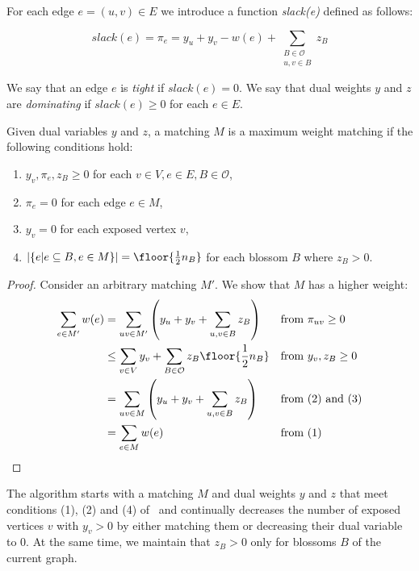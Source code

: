 \begin{defn}[slack]
    For each edge $e = (u, v) \in E$ we introduce a function \emph{slack(e)} defined as follows:

    \[slack(e) = \pi_e = y_u + y_v - w(e) + \sum_{\substack{B \in \mathcal{O} \\ u, v \in B}} z_B\]
\end{defn}

We say that an edge $e$ is \emph{tight} if $slack(e) = 0$. We say that dual weights $y$ and $z$ are \emph{dominating} if $slack(e) \geq 0$ for each $e \in E$.

\begin{theorem}\label{thm:conditions}
Given dual variables $y$ and $z$, a matching $M$ is a maximum weight matching if the following conditions hold:

\begin{enumerate}
    \renewcommand{\labelenumi}{(\arabic{enumi})}
    \item $y_v, \pi_{e}, z_B \geq 0$ for each $v \in V, e \in E, B \in \mathcal{O}$,
    \item $\pi_{e} = 0$ for each edge $e \in M$,
    \item $y_v = 0$ for each exposed vertex $v$,
    \item $|\{e | e \subseteq B, e \in M\}| = \floor{\frac{1}{2}n_B}$ for each blossom $B$ where $z_B > 0$.
\end{enumerate}

\begin{proof}
Consider an arbitrary matching $M'$. We show that $M$ has a higher weight:
\begin{align*}
    \sum_{e \in M'} w(e) &= \sum_{uv \in M'} \left( y_u + y_v + \sum_{u, v \in B} z_B \right) && \text{from } \pi_{uv} \geq 0 \\
    &\leq \sum_{v \in V} y_v + \sum_{B \in \mathcal{O}} z_B\floor{\frac{1}{2}n_B} && \text{from } y_v, z_B \geq 0 \\
    &= \sum_{uv \in M} \left( y_u + y_v + \sum_{u, v \in B} z_B \right) && \text{from (2) and (3)}\\
    &= \sum_{e \in M} w(e) && \text{from (1)}\\
\end{align*}
\end{proof}

\end{theorem}

The algorithm starts with a matching $M$ and dual weights $y$ and $z$ that meet conditions (1), (2) and (4) of~ and continually decreases the number of exposed vertices $v$ with $y_v > 0$ by either matching them or decreasing their dual variable to $0$. At the same time, we maintain that $z_B > 0$ only for blossoms $B$ of the current graph.

